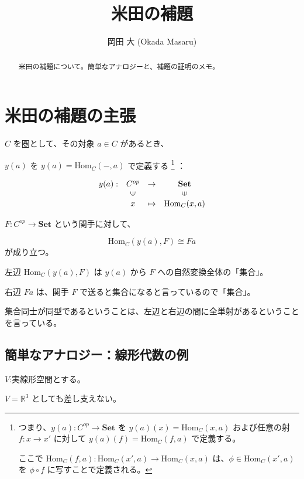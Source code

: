 \documentclass[uplatex,a4j,12pt,dvipdfmx]{jsarticle}
\title{
米田の補題
}
\author{
岡田 大 (Okada Masaru)
}
\begin{document}
\maketitle

\begin{abstract}
	米田の補題について。簡単なアナロジーと、補題の証明のメモ。
\end{abstract}

\section{米田の補題の主張}

$C$ を圏として、その対象 $a \in C$ があるとき、

$y(a)$ を $y(a) = \text{Hom}_{C}(-,a)$ で定義する
\footnote{
	つまり、$y(a) : C^{op} \to \textbf{Set}$ を $y(a)(x) = \text{Hom}_{C}(x,a)$ および任意の射 $f: x \to x'$ に対して $y(a)(f) = \text{Hom}_{C}(f,a)$ で定義する。

	ここで $\text{Hom}_{C}(f,a): \text{Hom}_{C}(x',a) \to \text{Hom}_{C}(x,a)$ は、$\phi \in \text{Hom}_{C}(x',a)$ を $\phi \circ f$ に写すことで定義される。
}
：

\[
	\begin{array}{cccc}
		y(a) : & C^{op}                  & \to     & \textbf{Set}            \\
		       & \rotatebox{90}{${\in}$} &         & \rotatebox{90}{${\in}$} \\
		       & x                       & \mapsto & \text{Hom}_{C}(x,a)
	\end{array}
\]


$F: C^{op} \to \textbf{Set}$ という関手に対して、

\[
	\text{Hom}_{C}(y(a),F) \cong Fa
\]
が成り立つ。

左辺
$\text{Hom}_{C}(y(a),F)$
は $y(a)$ から $F$ への自然変換全体の「集合」。

右辺 $Fa$ は、関手 $F$ で送ると集合になると言っているので「集合」。

集合同士が同型であるということは、左辺と右辺の間に全単射があるということを言っている。



\subsection{簡単なアナロジー：線形代数の例}

$V$:実線形空間とする。

$V=\mathbb{R}^{3}$ としても差し支えない。
\end{document}
